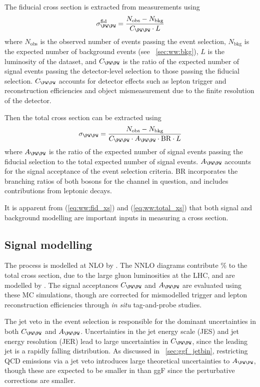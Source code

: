 The fiducial cross section is extracted from measurements using
\begin{equation}
	\sigma_{\WW}^{\text{fid}} = \frac{N_{\text{obs}} - N_{\text{bkg}}}{C_{\WW} \cdot L}
	\label{eq:ww:fid_xs}
\end{equation}
where $N_{\text{obs}}$ is the observed number of events passing the event selection, 
$N_{\text{bkg}}$ is the expected number of background events (see 
\Section~\ref{sec:ww:bkg}), $L$ is the luminosity of the dataset, and $C_{\WW}$ is the 
ratio of the expected number of signal events passing the detector-level selection to 
those passing the fiducial selection. $C_{\WW}$ accounts for detector effects such as 
lepton trigger and reconstruction efficiencies and object mismeasurement due to the 
finite resolution of the detector.

Then the total cross section can be extracted using
\begin{equation}
	\sigma_{\WW} = \frac{N_{\text{obs}} - N_{\text{bkg}}}{C_{\WW} \cdot A_{\WW} \cdot \text{BR} \cdot L}
	\label{eq:ww:total_xs}
\end{equation}
where $A_{\WW}$ is the ratio of the expected number of signal events passing the fiducial 
selection to the total expected number of signal events. $A_{\WW}$ accounts for the 
signal acceptance of the event selection criteria. BR incorporates the branching ratios 
of both \PW bosons for the channel in question, and includes contributions from leptonic 
\Ptau decays.

It is apparent from (\ref{eq:ww:fid_xs}) and (\ref{eq:ww:total_xs}) that both signal and 
background modelling are important inputs in measuring a cross section.



\subsection{Signal modelling}
\label{sec:ww:signal}

The \WW process is modelled at NLO by \meps{\mcatnlo}{\fherwig}. The NNLO \ggWW diagrams 
contribute \% to the total cross section, due to the large gluon luminosities at 
the LHC, and are modelled by \meps{\ggtoww}{\fherwig} \cite{gg2ww}. The signal 
acceptances $C_{\WW}$ and $A_{\WW}$ are evaluated using these MC simulations, though 
are corrected for mismodelled trigger and lepton reconstruction efficiencies through 
\textit{in situ} tag-and-probe studies.

The jet veto in the event selection is responsible for the dominant uncertainties in both 
$C_{\WW}$ and $A_{\WW}$. Uncertainties in the jet energy scale (JES) and jet energy 
resolution (JER) lead to large uncertainties in $C_{\WW}$, since the leading jet \pt is a 
rapidly falling distribution. As discussed in \Section~\ref{sec:ggf_jetbin}, restricting 
QCD emissions via a jet veto introduces large theoretical uncertainties to $A_{\WW}$, 
though these are expected to be smaller in \WW than ggF since the perturbative corrections 
are smaller.

